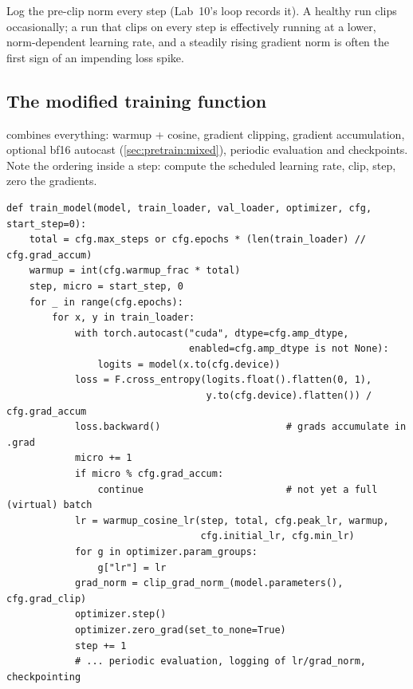 \begin{pitfall}
Log the pre-clip norm every step (Lab~10's loop records it). A healthy run clips occasionally;
a run that clips on every step is effectively running at a lower, norm-dependent learning rate,
and a steadily rising gradient norm is often the first sign of an impending loss spike.
\end{pitfall}

\subsection{The modified training function}\label{sec:pretrain:trainfn}

 combines everything: warmup + cosine, gradient clipping,
gradient accumulation, optional bf16 autocast (\cref{sec:pretrain:mixed}), periodic evaluation
and checkpoints. Note the ordering inside a step: compute the scheduled learning rate, clip,
step, zero the gradients.

\begin{lstlisting}[caption={The full training function from Lab 10 (abridged).},label={lst:pretrain:trainmodel}]
def train_model(model, train_loader, val_loader, optimizer, cfg, start_step=0):
    total = cfg.max_steps or cfg.epochs * (len(train_loader) // cfg.grad_accum)
    warmup = int(cfg.warmup_frac * total)
    step, micro = start_step, 0
    for _ in range(cfg.epochs):
        for x, y in train_loader:
            with torch.autocast("cuda", dtype=cfg.amp_dtype,
                                enabled=cfg.amp_dtype is not None):
                logits = model(x.to(cfg.device))
            loss = F.cross_entropy(logits.float().flatten(0, 1),
                                   y.to(cfg.device).flatten()) / cfg.grad_accum
            loss.backward()                      # grads accumulate in .grad
            micro += 1
            if micro % cfg.grad_accum:
                continue                         # not yet a full (virtual) batch
            lr = warmup_cosine_lr(step, total, cfg.peak_lr, warmup,
                                  cfg.initial_lr, cfg.min_lr)
            for g in optimizer.param_groups:
                g["lr"] = lr
            grad_norm = clip_grad_norm_(model.parameters(), cfg.grad_clip)
            optimizer.step()
            optimizer.zero_grad(set_to_none=True)
            step += 1
            # ... periodic evaluation, logging of lr/grad_norm, checkpointing
\end{lstlisting}

